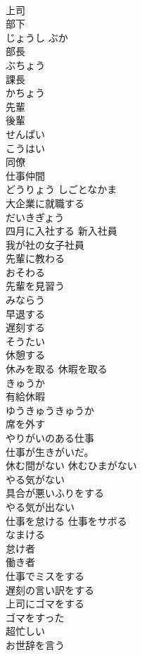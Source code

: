 \documentclass[8pt]{extreport}
\begin{document}
\begin{CJK}{UTF8}{min}
\\	上司 
\\	部下	
\\	じょうし ぶか
\\	部長	
\\	ぶちょう
\\	課長	
\\	かちょう
\\	先輩 
\\	後輩	
\\	せんぱい
\\	こうはい
\\	同僚 
\\	仕事仲間	
\\	どうりょう しごとなかま
\\	大企業に就職する	
\\	だいきぎょう
\\	四月に入社する 新入社員	
\\	我が社の女子社員	
\\	先輩に教わる	
\\	おそわる
\\	先輩を見習う	
\\	みならう
\\	早退する 
\\	遅刻する	
\\	そうたい
\\	休憩する	
\\	休みを取る 休暇を取る	
\\	きゅうか
\\	有給休暇	
\\	ゆうきゅうきゅうか
\\	席を外す	
\\	やりがいのある仕事	
\\	仕事が生きがいだ。	
\\	休む間がない 休むひまがない	
\\	やる気がない	
\\	具合が悪いふりをする	
\\	やる気が出ない	
\\	仕事を怠ける 仕事をサボる	
\\	なまける
\\	怠け者 
\\	働き者	
\\	仕事でミスをする	
\\	遅刻の言い訳をする	
\\	上司にゴマをする	
\\	ゴマをすった
\\	超忙しい	
\\	お世辞を言う	

\end{CJK}
\end{document}
